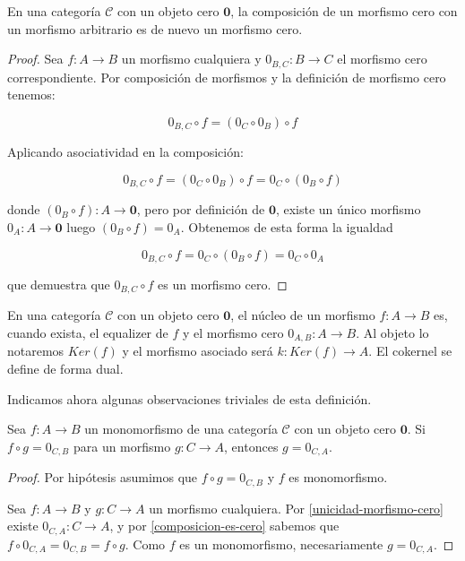 \begin{proposicion} \label{composicion-es-cero}
    En una categoría $\mathscr{C}$ con un objeto cero $\boldsymbol{0}$, la composición de un morfismo cero con un morfismo arbitrario es de nuevo un morfismo cero.
\end{proposicion}
\begin{proof}
    Sea $f: A \longrightarrow B$ un morfismo cualquiera y $0_{B,C}: B \longrightarrow C$ el morfismo cero correspondiente. Por composición de morfismos y la definición de morfismo cero tenemos:

    \begin{equation}
        0_{B,C} \circ f = \left(0_{C} \circ 0_{B}\right) \circ f 
    \end{equation}

    Aplicando asociatividad en la composición:

    \begin{equation}
        0_{B,C} \circ f = \left(0_{C} \circ 0_{B}\right) \circ f =  0_{C} \circ \left(0_{B} \circ f\right)
    \end{equation}

    donde $\left(0_{B} \circ f\right) : A \longrightarrow \boldsymbol{0}$, pero por definición de $\boldsymbol{0}$, existe un único morfismo $0_{A}: A \longrightarrow \boldsymbol{0}$ luego $\left(0_{B} \circ f\right) = 0_A$. Obtenemos de esta forma la igualdad

    $$
    0_{B,C} \circ f =  0_{C} \circ \left(0_{B} \circ f\right) = 0_{C} \circ 0_{A}
    $$

     que demuestra que $0_{B,C} \circ f$ es un morfismo cero.
\end{proof}


\begin{definicion}
    En una categoría $\mathscr{C}$ con un objeto cero  $\boldsymbol{0}$, el núcleo de un morfismo $f: A \longrightarrow B$ es, cuando exista, el equalizer de $f$ y el morfismo cero $0_{A,B}: A \longrightarrow B$. Al objeto lo notaremos $Ker(f)$ y el morfismo asociado será $k: Ker(f) \longrightarrow A$. El cokernel se define de forma dual.
\end{definicion}

Indicamos ahora algunas observaciones triviales de esta definición.

\begin{proposicion} \label{mono}
    Sea $f: A \longrightarrow B$ un monomorfismo de una categoría $\mathscr{C}$ con un objeto cero $\boldsymbol{0}$. Si $f \circ g = 0_{C,B}$ para un morfismo $g: C \longrightarrow A$, entonces $g = 0_{C,A}$.
\end{proposicion}
\begin{proof}
    Por hipótesis asumimos que $f \circ g = 0_{C,B}$ y $f$ es monomorfismo. 
    
    Sea $f: A \longrightarrow B$ y $g: C \longrightarrow A$ un morfismo cualquiera. Por \ref{unicidad-morfismo-cero} existe $0_{C,A}: C \longrightarrow A$, y por \ref{composicion-es-cero} sabemos que $f \circ 0_{C,A} = 0_{C,B} = f \circ g$. Como $f$ es un monomorfismo, necesariamente $g = 0_{C,A}$. 
\end{proof}

